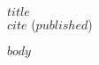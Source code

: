\documentclass[12pt,letterpaper,twoside]{article}
\begin{document}
\thispagestyle{empty}

\begin{flushleft}

\titlefont\huge{$title$} \\
\vspace{5mm}
\titlefont\Large{$cite$} ({$published$}) \\
\end{flushleft}
\vspace{-.5cm}


\singlespacing


$body$
\end{document}
